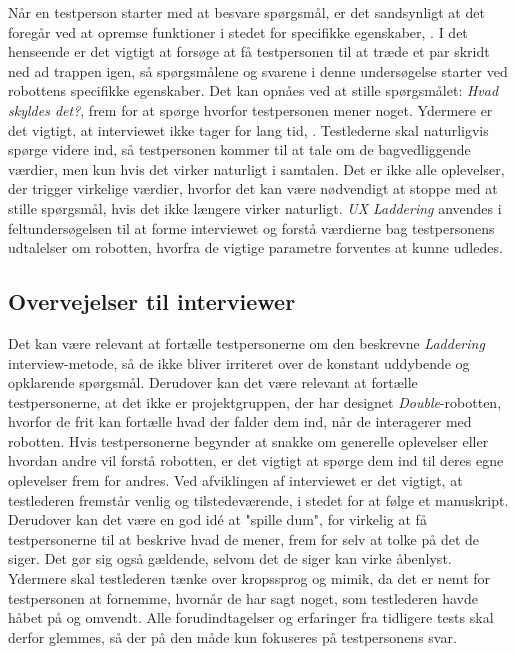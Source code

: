 Når en testperson starter med at besvare spørgsmål, er det sandsynligt at det foregår ved at opremse funktioner i stedet for specifikke egenskaber, \parencite[s. 3]{PDF:LadderingTheUserExperience}. I det henseende er det vigtigt at forsøge at få testpersonen til at træde et par skridt ned ad trappen igen, så spørgsmålene og svarene i denne undersøgelse starter ved robottens specifikke egenskaber. Det kan opnåes ved at stille spørgsmålet: \textit{Hvad skyldes det?}, frem for at spørge hvorfor testpersonen mener noget. Ydermere er det vigtigt, at interviewet ikke tager for lang tid, \parencite[s. 4]{PDF:LadderingTheUserExperience}. Testlederne skal naturligvis spørge videre ind, så testpersonen kommer til at tale om de bagvedliggende værdier, men kun hvis det virker naturligt i samtalen. Det er ikke alle oplevelser, der trigger virkelige værdier, hvorfor det kan være nødvendigt at stoppe med at stille spørgsmål, hvis det ikke længere virker naturligt. \blankline
%
\textit{UX Laddering} anvendes i feltundersøgelsen til at forme interviewet og forstå værdierne bag testpersonens udtalelser om robotten, hvorfra de vigtige parametre forventes at kunne udledes.

\subsection{Overvejelser til interviewer}
\label{ParametreOvervejelserTestleder}
%
Det kan være relevant at fortælle testpersonerne om den beskrevne \textit{Laddering} interview-metode, så de ikke bliver irriteret over de konstant uddybende og opklarende spørgsmål. Derudover kan det være relevant at fortælle testpersonerne, at det ikke er projektgruppen, der har designet \textit{Double}-robotten, hvorfor de frit kan fortælle hvad der falder dem ind, når de interagerer med robotten. Hvis testpersonerne begynder at snakke om generelle oplevelser eller hvordan andre vil forstå robotten, er det vigtigt at spørge dem ind til deres egne oplevelser frem for andres. \blankline
%
Ved afviklingen af interviewet er det vigtigt, at testlederen fremstår venlig og tilstedeværende, i stedet for at følge et manuskript. Derudover kan det være en god idé at "spille dum", for virkelig at få testpersonerne til at beskrive hvad de mener, frem for selv at tolke på det de siger. Det gør sig også gældende, selvom det de siger kan virke åbenlyst. Ydermere skal testlederen tænke over kropssprog og mimik, da det er nemt for testpersonen at fornemme, hvornår de har sagt noget, som testlederen havde håbet på og omvendt. Alle forudindtagelser og erfaringer fra tidligere tests skal derfor glemmes, så der på den måde kun fokuseres på testpersonens svar. 
